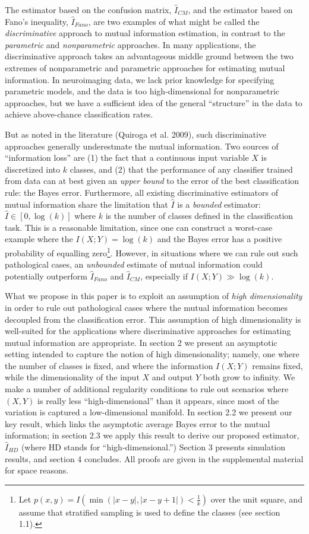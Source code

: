 \documentclass{article}
\begin{document}
The estimator based on the confusion matrix, $\hat{I}_{CM}$, and
the estimator based on Fano's inequality, $\hat{I}_{Fano}$, are two examples of what
might be called the \emph{discriminative} approach to mutual
information estimation, in contrast to the \emph{parametric} and
\emph{nonparametric} approaches.  In many applications, the
discriminative approach takes an advantageous middle ground between
the two extremes of nonparametric and parametric approaches for
estimating mutual information. In neuroimaging data, we lack prior
knowledge for specifying parametric models, and the data is too
high-dimensional for nonparametric approaches, but we have a
sufficient idea of the general ``structure'' in the data to achieve
above-chance classification rates.

But as noted in the literature (Quiroga et al. 2009), such
discriminative approaches generally underestmate the mutual information.  Two sources of
``information loss'' are (1) the fact that a continuous input variable
$X$ is discretized into $k$ classes, and (2) that the performance of
any classifier trained from data can at best given an \emph{upper
  bound} to the error of the best classification rule: the Bayes
error. Furthermore, all existing discriminative estimators of mutual information share the
limitation that $\hat{I}$ is a \emph{bounded} estimator:
$\hat{I} \in [0, \log(k)]$
where $k$ is the number of classes defined in the classification task.
This is a reasonable limitation, since one can construct a worst-case
example where the $I(X; Y) = \log(k)$ and the Bayes error has a
positive probability of equalling zero\footnote{Let $p(x, y) =
  I(\min(|x - y|, |x - y + 1|) < \frac{1}{k})$ over the unit square,
  and assume that stratified sampling is used to define the classes
  (see section 1.1).}.  However, in situations where we can rule out
such pathological cases, an \emph{unbounded} estimate of mutual
information could potentially outperform $\hat{I}_{Fano}$ and
$\hat{I}_{CM}$, especially if $I(X; Y) \gg \log(k)$.

What we propose in this paper is to exploit an assumption of
\emph{high dimensionality} in order to rule out pathological cases
where the mutual information becomes decoupled from the classification
error.  This assumption of high dimensionality is well-suited for the
applications where discriminative approaches for estimating mutual
information are appropriate.  In section 2 we present an asymptotic
setting intended to capture the notion of high dimensionality; namely,
one where the number of classes is fixed, and where the information
$I(X; Y)$ remains fixed, while the dimensionality of the input $X$ and
output $Y$ both grow to infinity.  We make a number of additional
regularity conditions to rule out scenarios where $(X, Y)$ is really
less ``high-dimensional'' than it appears, since most of the variation
is captured a low-dimensional manifold.  In section 2.2 we present our
key result, which links the asymptotic average Bayes error to the
mutual information; in section 2.3 we apply this result to derive our
proposed estimator, $\hat{I}_{HD}$ (where HD stands for ``high-dimensional.'')  Section 3 presents
simulation results, and section 4 concludes.  All proofs are given in the supplemental material for space reasons.
\end{document}
